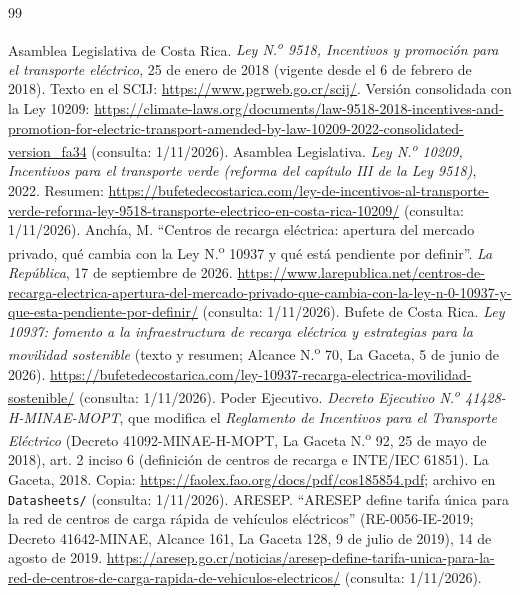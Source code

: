\begin{thebibliography}{99}
\small
{}
\setlength{\itemsep}{2pt}
 Asamblea Legislativa de Costa Rica. \emph{Ley N.\textsuperscript{o} 9518, Incentivos y promoción para el transporte eléctrico}, 25 de enero de 2018 (vigente desde el 6 de febrero de 2018). Texto en el SCIJ: \url{https://www.pgrweb.go.cr/scij/}. Versión consolidada con la Ley 10209: \url{https://climate-laws.org/documents/law-9518-2018-incentives-and-promotion-for-electric-transport-amended-by-law-10209-2022-consolidated-version_fa34} (consulta: 1/11/2026).
 Asamblea Legislativa. \emph{Ley N.\textsuperscript{o} 10209, Incentivos para el transporte verde (reforma del capítulo III de la Ley 9518)}, 2022. Resumen: \url{https://bufetedecostarica.com/ley-de-incentivos-al-transporte-verde-reforma-ley-9518-transporte-electrico-en-costa-rica-10209/} (consulta: 1/11/2026).
 Anchía, M. ``Centros de recarga eléctrica: apertura del mercado privado, qué cambia con la Ley N.\textsuperscript{o} 10937 y qué está pendiente por definir''. \emph{La República}, 17 de septiembre de 2026. \url{https://www.larepublica.net/centros-de-recarga-electrica-apertura-del-mercado-privado-que-cambia-con-la-ley-n-0-10937-y-que-esta-pendiente-por-definir/} (consulta: 1/11/2026).
 Bufete de Costa Rica. \emph{Ley 10937: fomento a la infraestructura de recarga eléctrica y estrategias para la movilidad sostenible} (texto y resumen; Alcance N.\textsuperscript{o} 70, La Gaceta, 5 de junio de 2026). \url{https://bufetedecostarica.com/ley-10937-recarga-electrica-movilidad-sostenible/} (consulta: 1/11/2026).
 Poder Ejecutivo. \emph{Decreto Ejecutivo N.\textsuperscript{o} 41428-H-MINAE-MOPT}, que modifica el \emph{Reglamento de Incentivos para el Transporte Eléctrico} (Decreto 41092-MINAE-H-MOPT, La Gaceta N.\textsuperscript{o} 92, 25 de mayo de 2018), art. 2 inciso 6 (definición de centros de recarga e INTE/IEC 61851). La Gaceta, 2018. Copia: \url{https://faolex.fao.org/docs/pdf/cos185854.pdf}; archivo en \texttt{Datasheets/} (consulta: 1/11/2026).
 ARESEP. ``ARESEP define tarifa única para la red de centros de carga rápida de vehículos eléctricos'' (RE-0056-IE-2019; Decreto 41642-MINAE, Alcance 161, La Gaceta 128, 9 de julio de 2019), 14 de agosto de 2019. \url{https://aresep.go.cr/noticias/aresep-define-tarifa-unica-para-la-red-de-centros-de-carga-rapida-de-vehiculos-electricos/} (consulta: 1/11/2026).

\end{thebibliography}

